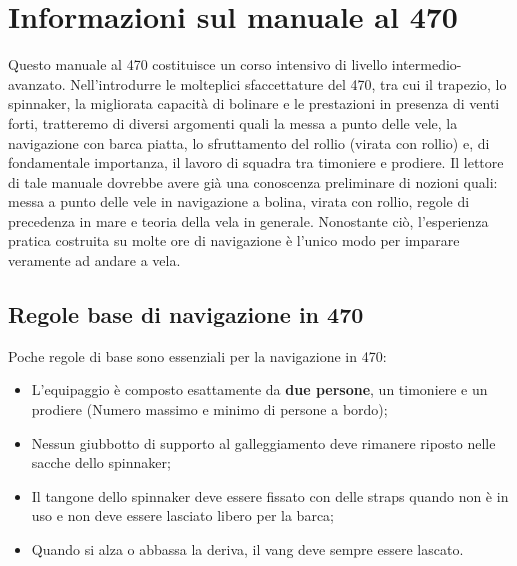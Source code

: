 \section{Informazioni sul manuale al 470}
\label{sec:InformazioniSulManuale}
Questo manuale al 470 costituisce un corso intensivo di livello
intermedio-avanzato. Nell'introdurre le molteplici sfaccettature del 470, tra
cui il trapezio, lo spinnaker, la migliorata capacità di bolinare e
le prestazioni in presenza di venti forti, tratteremo di diversi argomenti quali
la messa a punto delle vele, la navigazione con barca piatta, lo sfruttamento
del rollio (virata con rollio) e, di
fondamentale importanza, il lavoro di squadra tra timoniere e prodiere. Il
lettore di tale manuale dovrebbe avere già una conoscenza preliminare di nozioni
quali: messa a punto delle vele in navigazione a bolina, virata con rollio,
regole di precedenza in mare e teoria della vela in generale. Nonostante ciò, l'esperienza
pratica costruita su molte ore di navigazione è l'unico modo per imparare
veramente ad andare a vela.

\subsection{Regole base di navigazione in 470}
\label{sub:RegoleBaseDiNavigazioneIn470}
Poche regole di base sono essenziali per la navigazione in 470:
\begin{itemize}
    \item L'equipaggio è composto esattamente da \textbf{due persone}, un timoniere e un
          prodiere (Numero massimo e minimo di persone a bordo);
    \item Nessun giubbotto di supporto al galleggiamento deve rimanere riposto
          nelle sacche dello spinnaker;
    \item Il tangone dello spinnaker deve essere fissato con delle straps quando
          non è in uso e non deve essere lasciato libero per la barca;
    \item Quando si alza o abbassa la deriva, il vang deve sempre essere lascato.
\end{itemize}

